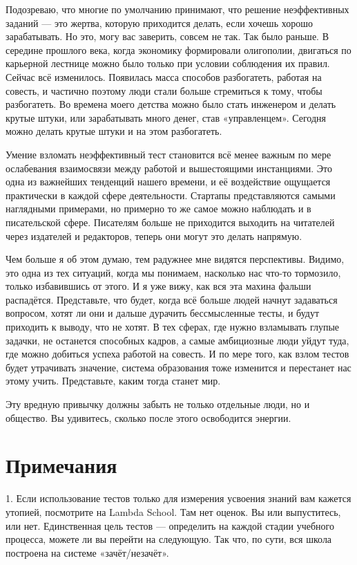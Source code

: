 \documentclass[ebook,12pt,oneside,openany]{memoir}
\begin{document}
Подозреваю, что многие по умолчанию принимают, что решение
неэффективных заданий — это жертва, которую приходится делать, если
хочешь хорошо зарабатывать. Но это, могу вас заверить, совсем не так.
Так было раньше. В середине прошлого века, когда экономику формировали
олигополии, двигаться по карьерной лестнице можно было только при
условии соблюдения их правил. Сейчас всё изменилось. Появилась масса
способов разбогатеть, работая на совесть, и частично поэтому люди
стали больше стремиться к тому, чтобы разбогатеть. Во времена моего
детства можно было стать инженером и делать крутые штуки, или
зарабатывать много денег, став «управленцем». Сегодня можно делать
крутые штуки и на этом разбогатеть. \newline

Умение взломать неэффективный тест становится всё менее важным по мере
ослабевания взаимосвязи между работой и вышестоящими инстанциями. Это
одна из важнейших тенденций нашего времени, и её воздействие ощущается
практически в каждой сфере деятельности. Стартапы представляются
самыми наглядными примерами, но примерно то же самое можно наблюдать и
в писательской сфере. Писателям больше не приходится выходить на
читателей через издателей и редакторов, теперь они могут это делать
напрямую. \newline

Чем больше я об этом думаю, тем радужнее мне видятся перспективы.
Видимо, это одна из тех ситуаций, когда мы понимаем, насколько нас
что-то тормозило, только избавившись от этого. И я уже вижу, как вся
эта махина фальши распадётся. Представьте, что будет, когда всё больше
людей начнут задаваться вопросом, хотят ли они и дальше дурачить
бессмысленные тесты, и будут приходить к выводу, что не хотят. В тех
сферах, где нужно взламывать глупые задачки, не останется способных
кадров, а самые амбициозные люди уйдут туда, где можно добиться успеха
работой на совесть. И по мере того, как взлом тестов будет утрачивать
значение, система образования тоже изменится и перестанет нас этому
учить. Представьте, каким тогда станет мир. \newline

Эту вредную привычку должны забыть не только отдельные люди, но и
общество. Вы удивитесь, сколько после этого освободится энергии. \newline

\section*{Примечания}
1. Если использование тестов только для измерения усвоения знаний вам
кажется утопией, посмотрите на Lambda School. Там нет оценок. Вы или
выпуститесь, или нет. Единственная цель тестов — определить на каждой
стадии учебного процесса, можете ли вы перейти на следующую. Так что,
по сути, вся школа построена на системе «зачёт/незачёт».
\end{document}
